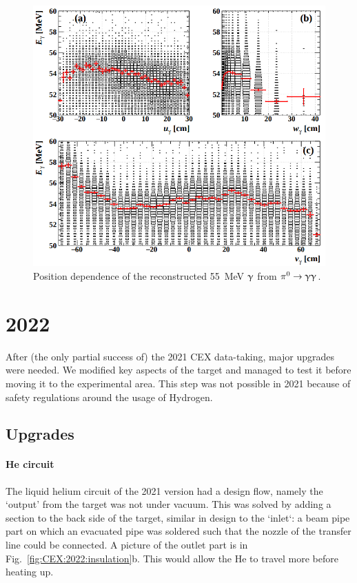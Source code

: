 \begin{refsection}
        \begin{figure}
            \centering
            \includegraphics[width=0.9\linewidth]{Figures/LH2/2021/CEX2021_position-dependence.png}
            \caption[CEX 2021: Energy position dependence]{Position dependence of the reconstructed \SI{55}{MeV} $\upgamma$ from $\pi^0\rightarrow\upgamma\upgamma$.}
            \label{fig:CEX2021:nonuniformity}
        \end{figure}

\section{2022}
    After (the only partial success of) the 2021 CEX data-taking, major upgrades were needed.
    We modified key aspects of the target and managed to test it before moving it to the experimental area.
    This step was not possible in 2021 because of safety regulations around the usage of Hydrogen.

    \subsection{Upgrades}
        \paragraph{He circuit} The liquid helium circuit of the 2021 version had a design flow, namely the `output' from the target was not under vacuum.
        This was solved by adding a section to the back side of the target, similar in design to the `inlet`: a beam pipe part on which an evacuated pipe was soldered such that the nozzle of the transfer line could be connected.
        A picture of the outlet part is in Fig.~\ref{fig:CEX:2022:insulation}b. 
        This would allow the He to travel more before heating up.
        

\end{refsection}
